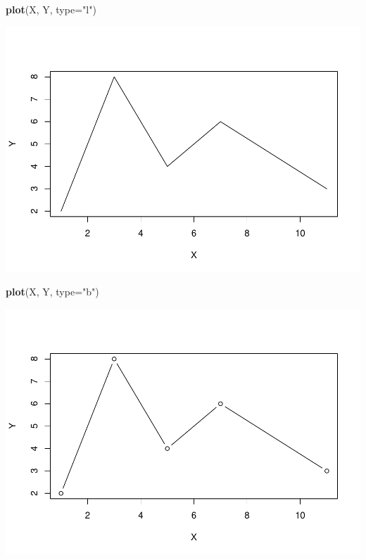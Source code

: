 \documentclass[
]{book}
\newenvironment{Shaded}{\begin{snugshade}}{\end{snugshade}}
\newcommand{\DataTypeTok}[1]{\textcolor[rgb]{0.13,0.29,0.53}{#1}}
\newcommand{\KeywordTok}[1]{\textcolor[rgb]{0.13,0.29,0.53}{\textbf{#1}}}
\newcommand{\NormalTok}[1]{#1}
\newcommand{\StringTok}[1]{\textcolor[rgb]{0.31,0.60,0.02}{#1}}
\theoremstyle{definition}
\theoremstyle{definition}
\theoremstyle{definition}
\theoremstyle{remark}
\begin{document}
\begin{Shaded}
\begin{Highlighting}[]
\KeywordTok{plot}\NormalTok{(X, Y, }\DataTypeTok{type=}\StringTok{"l"}\NormalTok{)}
\end{Highlighting}
\end{Shaded}

\begin{center}\includegraphics[width=0.9\linewidth]{07chap06_Graficos_I_files/figure-latex/unnamed-chunk-6-1} \end{center}

\begin{Shaded}
\begin{Highlighting}[]
\KeywordTok{plot}\NormalTok{(X, Y, }\DataTypeTok{type=}\StringTok{"b"}\NormalTok{)}
\end{Highlighting}
\end{Shaded}

\begin{center}\includegraphics[width=0.9\linewidth]{07chap06_Graficos_I_files/figure-latex/unnamed-chunk-7-1} \end{center}
\end{document}
